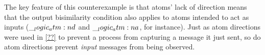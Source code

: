 The key feature of this counterexample is that atoms' lack of direction means that the output bisimilarity condition also applies to atoms intended to act as inputs ($\__logic_atm:n {d}$ and $\__logic_atm:n {a}$, for instance).
Just as atom directions were used in \cref{??} to prevent a process from capturing a message it just sent, so do atom directions prevent \emph{input} messages from being observed.




